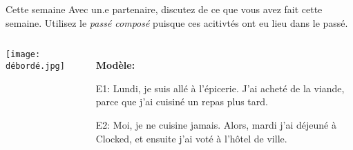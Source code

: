\begin{frame}{Cette semaine}
  Avec un.e partenaire, discutez de ce que vous avez fait cette semaine.
  Utilisez le \emph{passé composé} puisque ces acitivtés ont eu lieu dans le passé.
  \begin{columns}
      \begin{center}
        \texttt{[image: débordé.jpg]}
      \end{center}
      \begin{itemize}
        \item[] \textbf{Modèle:}
        \item[E1:] Lundi, je suis allé à l'épicerie. J'ai acheté de la viande, parce que j'ai cuisiné un repas plus tard.
        \item[E2:] Moi, je ne cuisine jamais. Alors, mardi j'ai déjeuné à Clocked, et ensuite j'ai voté à l'hôtel de ville.
      \end{itemize}
  \end{columns}
\end{frame}